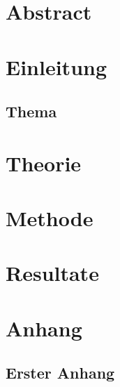   \chapter{Abstract}
    \lipsum[3]

  \mainmatter

  \chapter{Einleitung}
  \lipsum[4-5]
  \section{Thema}
  \lipsum[5-6]

  \chapter{Theorie}
  \lipsum[6] \cite{IEEEexample:article_typical}
  \lipsum[7] \cite{mirrorcle_userguide}

  \chapter{Methode}
  \lipsum[8] \cite{microchip_spi} \cite{verryUseFulArticle}

  \chapter{Resultate}
  \lipsum[9]

  \appendix
  \chapter{Anhang}
  \section{Erster Anhang}

  \backmatter
  
  
  \listoffigures


